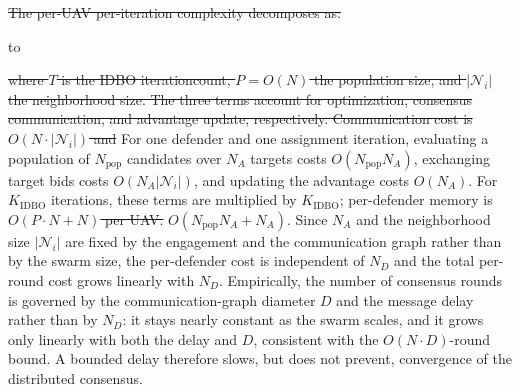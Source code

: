 \documentclass[lettersize,journal]{IEEEtran}
\providecommand{\DIFadd}[1]{{\protect\color{blue}#1}} %
\providecommand{\DIFdel}[1]{{\protect\color{red}\sout{#1}}}                      %
\newcommand{\DIFdelDISPLAY}[1]{%
  \par\addvspace{4pt}%
  \sbox{\DIFDELbox}{$\displaystyle\color{red}\begin{aligned}#1\end{aligned}$}%
  \noindent\hbox to\hsize{\hfil %
    \rlap{\usebox{\DIFDELbox}}%
    \raisebox{\dimexpr(\ht\DIFDELbox-\dp\DIFDELbox)/2\relax}[0pt][0pt]{\textcolor{red}{\rule{\wd\DIFDELbox}{0.6pt}}}%
    \hfil}%
  \par\addvspace{4pt}%
} %
\providecommand{\DIFaddbegin}{} %
\providecommand{\DIFaddend}{} %
\providecommand{\DIFdelbegin}{} %
\providecommand{\DIFdelend}{} %
\newcommand{\DIFscaledelfig}{0.5}
\newlength{\DIFdelgraphicswidth} %
\newlength{\DIFdelgraphicsheight} %
\newcommand{\DIFaddincludegraphics}[2][]{{\color{blue}\fbox{\DIFOincludegraphics[#1]{#2}}}} %
\newcommand{\DIFdelincludegraphics}[2][]{%
\sbox{\DIFdelgraphicsbox}{\DIFOincludegraphics[#1]{#2}}%
\settoboxwidth{\DIFdelgraphicswidth}{\DIFdelgraphicsbox} %
\settoboxtotalheight{\DIFdelgraphicsheight}{\DIFdelgraphicsbox} %
\scalebox{\DIFscaledelfig}{%
\parbox[b]{\DIFdelgraphicswidth}{\usebox{\DIFdelgraphicsbox}\\[-\baselineskip] \rule{\DIFdelgraphicswidth}{0em}}\llap{\resizebox{\DIFdelgraphicswidth}{\DIFdelgraphicsheight}{%
\setlength{\unitlength}{\DIFdelgraphicswidth}%
\begin{picture}(1,1)%
\thicklines\linethickness{2pt} %
{\color[rgb]{1,0,0}\put(0,0){\framebox(1,1){}}}%
{\color[rgb]{1,0,0}\put(0,0){\line( 1,1){1}}}%
{\color[rgb]{1,0,0}\put(0,1){\line(1,-1){1}}}%
\end{picture}%
}\hspace*{3pt}}} %
} %
\DeclareRobustCommand{\DIFaddbegin}{\DIFOaddbegin \let\includegraphics\DIFaddincludegraphics} %
\DeclareRobustCommand{\DIFaddend}{\DIFOaddend \let\includegraphics\DIFOincludegraphics} %
\DeclareRobustCommand{\DIFdelbegin}{\DIFOdelbegin \let\includegraphics\DIFdelincludegraphics} %
\DeclareRobustCommand{\DIFdelend}{\DIFOaddend \let\includegraphics\DIFOincludegraphics} %
\begin{document}
\DIFdelbegin \DIFdel{The per-UAV per-iteration complexity decomposes as:
}%

\DIFdelDISPLAY{%
C_{\text{total}} = O(T \cdot P \cdot N^2) + O(N \cdot |\mathcal{N}_i|) + O(N)
}
\DIFdel{where $T$ is the IDBO iterationcount, $P = O(N)$ the population size, and $|\mathcal{N}_i|$ the neighborhood size. The three terms account for optimization, consensus communication, and
        advantage update, respectively. Communication cost is $O(N \cdot |\mathcal{N}_i|)$ and }\DIFdelend \DIFaddbegin \DIFadd{For one defender and one assignment iteration, evaluating a population of $N_{\mathrm{pop}}$
candidates over $N_A$ targets costs $O(N_{\mathrm{pop}}N_A)$, exchanging target bids costs
$O(N_A|\mathcal N_i|)$, and updating the advantage costs $O(N_A)$. For $K_{\mathrm{IDBO}}$
iterations, these terms are multiplied by $K_{\mathrm{IDBO}}$; per-defender }\DIFaddend memory is
\DIFdelbegin \DIFdel{$O(P \cdot N + N)$ per UAV.
}\DIFdelend \DIFaddbegin \DIFadd{$O(N_{\mathrm{pop}}N_A+N_A)$.
Since $N_A$ and the neighborhood size $|\mathcal N_i|$ are fixed by the engagement and the
communication graph rather than by the swarm size, the per-defender cost is independent of
$N_D$ and the total per-round cost grows linearly with $N_D$. Empirically, the number of
consensus rounds is governed by the communication-graph diameter $D$ and the message delay
rather than by $N_D$: it stays nearly constant as the swarm scales, and it grows only linearly
with both the delay and $D$, consistent with the $O(N\cdot D)$-round bound. A bounded delay
therefore slows, but does not prevent, convergence of the distributed consensus.
}
\end{document}
